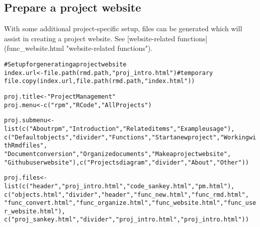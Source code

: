 \documentclass{article}\usepackage[]{graphicx}\usepackage[]{color}
\makeatletter
\newcommand{\hlstr}[1]{\textcolor[rgb]{0.863,0.196,0.184}{#1}}%
\newcommand{\hlcom}[1]{\textcolor[rgb]{0.345,0.431,0.459}{#1}}%
\newcommand{\hlstd}[1]{\textcolor[rgb]{0.514,0.58,0.588}{#1}}%
\newcommand{\hlkwb}[1]{\textcolor[rgb]{0.522,0.6,0}{#1}}%
\newcommand{\hlkwd}[1]{\textcolor[rgb]{0.576,0.631,0.631}{#1}}%
\newenvironment{kframe}{%
 \def\at@end@of@kframe{}%
 \ifinner\ifhmode%
  \def\at@end@of@kframe{\end{minipage}}%
  \begin{minipage}{\columnwidth}%
 \fi\fi%
 \def\FrameCommand##1{\hskip\@totalleftmargin \hskip-\fboxsep
 \colorbox{shadecolor}{##1}\hskip-\fboxsep
     \hskip-\linewidth \hskip-\@totalleftmargin \hskip\columnwidth}%
 \MakeFramed {\advance\hsize-\width
   \@totalleftmargin\z@ \linewidth\hsize
   \@setminipage}}%
 {\par\unskip\endMakeFramed%
 \at@end@of@kframe}
\newenvironment{knitrout}{}{} %
\makeatother
\begin{document}
\subsection{Prepare a project website}
With some additional project-specific setup, files can be generated which will assist in creating a project website.
See [website-related functions](func\_website.html "website-related functions").

\begin{knitrout}
\color{fgcolor}\begin{kframe}
\begin{alltt}
\hlcom{# Setup for generating a project website}
\hlstd{index.url} \hlkwb{<-} \hlkwd{file.path}\hlstd{(rmd.path,} \hlstr{"proj_intro.html"}\hlstd{)}  \hlcom{# temporary}
\hlkwd{file.copy}\hlstd{(index.url,} \hlkwd{file.path}\hlstd{(rmd.path,} \hlstr{"index.html"}\hlstd{))}

\hlstd{proj.title} \hlkwb{<-} \hlstr{"Project Management"}
\hlstd{proj.menu} \hlkwb{<-} \hlkwd{c}\hlstd{(}\hlstr{"rpm"}\hlstd{,} \hlstr{"R Code"}\hlstd{,} \hlstr{"All Projects"}\hlstd{)}

\hlstd{proj.submenu} \hlkwb{<-} \hlkwd{list}\hlstd{(}\hlkwd{c}\hlstd{(}\hlstr{"About rpm"}\hlstd{,} \hlstr{"Introduction"}\hlstd{,} \hlstr{"Related items"}\hlstd{,} \hlstr{"Example usage"}\hlstd{),}
    \hlkwd{c}\hlstd{(}\hlstr{"Default objects"}\hlstd{,} \hlstr{"divider"}\hlstd{,} \hlstr{"Functions"}\hlstd{,} \hlstr{"Start a new project"}\hlstd{,} \hlstr{"Working with Rmd files"}\hlstd{,}
        \hlstr{"Document conversion"}\hlstd{,} \hlstr{"Organize documents"}\hlstd{,} \hlstr{"Make a project website"}\hlstd{,}
        \hlstr{"Github user website"}\hlstd{),} \hlkwd{c}\hlstd{(}\hlstr{"Projects diagram"}\hlstd{,} \hlstr{"divider"}\hlstd{,} \hlstr{"About"}\hlstd{,} \hlstr{"Other"}\hlstd{))}

\hlstd{proj.files} \hlkwb{<-} \hlkwd{list}\hlstd{(}\hlkwd{c}\hlstd{(}\hlstr{"header"}\hlstd{,} \hlstr{"proj_intro.html"}\hlstd{,} \hlstr{"code_sankey.html"}\hlstd{,} \hlstr{"pm.html"}\hlstd{),}
    \hlkwd{c}\hlstd{(}\hlstr{"objects.html"}\hlstd{,} \hlstr{"divider"}\hlstd{,} \hlstr{"header"}\hlstd{,} \hlstr{"func_new.html"}\hlstd{,} \hlstr{"func_rmd.html"}\hlstd{,}
        \hlstr{"func_convert.html"}\hlstd{,} \hlstr{"func_organize.html"}\hlstd{,} \hlstr{"func_website.html"}\hlstd{,} \hlstr{"func_user_website.html"}\hlstd{),}
    \hlkwd{c}\hlstd{(}\hlstr{"proj_sankey.html"}\hlstd{,} \hlstr{"divider"}\hlstd{,} \hlstr{"proj_intro.html"}\hlstd{,} \hlstr{"proj_intro.html"}\hlstd{))}


\end{alltt}
\end{kframe}
\end{knitrout}
\end{document}
